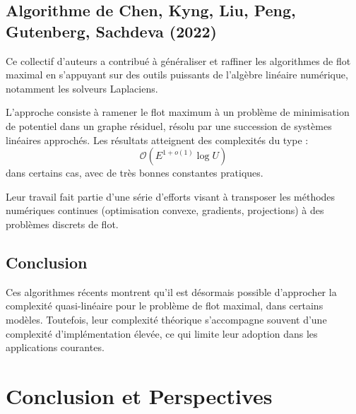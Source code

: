 \documentclass[a4paper]{article}
\begin{document}
\subsection{Algorithme de Chen, Kyng, Liu, Peng, Gutenberg, Sachdeva (2022)}

Ce collectif d’auteurs a contribué à généraliser et raffiner les algorithmes de flot maximal en s’appuyant sur des outils puissants de l’algèbre linéaire numérique, notamment les solveurs Laplaciens.

L’approche consiste à ramener le flot maximum à un problème de minimisation de potentiel dans un graphe résiduel, résolu par une succession de systèmes linéaires approchés\cite{chen2022maximumflowminimumcostflow}. Les résultats atteignent des complexités du type :
\[
\mathcal{O}\left(E^{1 + o(1)} \log U\right)
\]
dans certains cas, avec de très bonnes constantes pratiques.

Leur travail fait partie d’une série d’efforts visant à transposer les méthodes numériques continues (optimisation convexe, gradients, projections) à des problèmes discrets de flot.

\subsection{Conclusion}

Ces algorithmes récents montrent qu’il est désormais possible d’approcher la complexité quasi-linéaire pour le problème de flot maximal, dans certains modèles. Toutefois, leur complexité théorique s’accompagne souvent d’une complexité d’implémentation élevée, ce qui limite leur adoption dans les applications courantes.

\section{Conclusion et Perspectives}
\printbibliography[heading=bibintoc]
\end{document}
